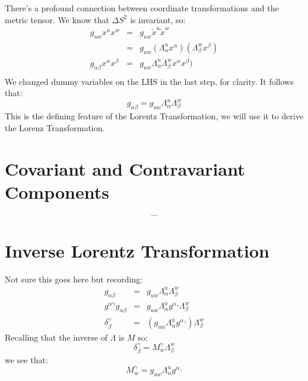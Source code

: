 \documentclass[12pt]{book}
\begin{document}
There's a profound connection between coordinate transformations and the metric tensor.
We know that $\Delta S^2$ is invariant, so:
\begin{eqnarray*}
g_{uw} x^u x^w &=& g_{uw} \widetilde{x}^u \widetilde{x}^w\\
&=& g_{uw} (\Lambda^u_\alpha x^\alpha)(\Lambda^w_\beta x^\beta)\\
g_{\alpha\beta} x^\alpha x^\beta &=& g_{uw} \Lambda^u_\alpha \Lambda^w_\beta x^\alpha x^\beta)\\
\end{eqnarray*}
We changed dummy variables on the LHS in the last step, for clarity.  It follows that:
$$g_{\alpha\beta} = g_{uw} \Lambda^u_\alpha \Lambda^w_\beta$$
This is the defining feature of the Lorentz Transformation, we will use it to derive the Lorenz Transformation.

\section{Covariant and Contravariant Components}
$$\ldots$$

\section{Inverse Lorentz Transformation}
Not sure this goes here but recording:
\begin{eqnarray*}
g_{\alpha\beta} &=& g_{uw} \Lambda^u_\alpha \Lambda^w_{\beta}\\
g^{\alpha\gamma} g_{\alpha\beta} &=& g_{uw} \Lambda^u_{\alpha} g^{\alpha_\gamma}\Lambda^w_\beta\\
\delta^\gamma_\beta &=& (g_{uw} \Lambda^u_{\alpha} g^{\alpha_\gamma}) \Lambda^w_\beta
\end{eqnarray*}
Recalling that the inverse of $\Lambda$ is $M$ so:
$$\delta^\gamma_\beta = M^\gamma_w \Lambda^w_\beta$$
we see that:
$$M^\gamma_w = g_{uw} \Lambda^u_{\alpha} g^{\alpha_\gamma}$$
\end{document}
